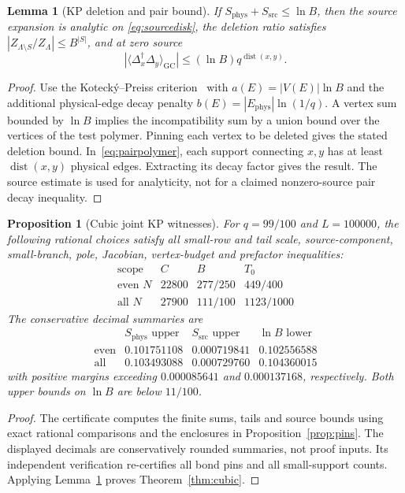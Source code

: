 \documentclass[11pt]{article}
\theoremstyle{plain}
\newtheorem{lemma}{Lemma}
\newtheorem{proposition}{Proposition}
\theoremstyle{remark}
\DeclareMathOperator{\dist}{dist}
\newcommand{\GC}{\mathrm{GC}}
\newcommand{\src}{\mathrm{src}}
\newcommand{\phys}{\mathrm{phys}}
\begin{document}
\begin{lemma}[KP deletion and pair bound]\label{lem:kp}
If $S_\phys+S_\src\le\ln B$, then the source expansion is analytic on
\eqref{eq:sourcedisk}, the deletion ratio satisfies
$|Z_{\Lambda\setminus S}/Z_\Lambda|\le B^{|S|}$, and at zero source
\[
|\langle\Delta_x^\dagger\Delta_y\rangle_\GC|
\le(\ln B)q^{\dist(x,y)}.
\]
\end{lemma}
\begin{proof}
Use the Koteck\'y--Preiss criterion~\cite{kotecky1986} with
$a(E)=|V(E)|\ln B$ and the additional physical-edge decay penalty
$b(E)=|E_\phys|\ln(1/q)$. A vertex sum bounded by $\ln B$ implies the
incompatibility sum by a union bound over the vertices of the test polymer.
Pinning each vertex to be deleted gives the stated deletion bound.
In~\eqref{eq:pairpolymer}, each support connecting $x,y$ has at least
$\dist(x,y)$ physical edges. Extracting its decay factor gives the result.
The source estimate is used for analyticity, not for a claimed nonzero-source
pair decay inequality.
\end{proof}

\begin{proposition}[Cubic joint KP witnesses]\label{prop:cubicbudget}
For $q=99/100$ and $L=100000$, the following rational choices satisfy all
small-row and tail scale, source-component, small-branch, pole, Jacobian,
vertex-budget and prefactor inequalities:
\[
\begin{array}{c|ccc}
\text{scope}&C&B&T_0\\\hline
\text{even }N&22800&277/250&449/400\\
\text{all }N&27900&111/100&1123/1000
\end{array}
\]
The conservative decimal summaries are
\[
\begin{array}{c|ccc}
& S_\phys\text{ upper}&S_\src\text{ upper}&\ln B\text{ lower}\\\hline
\text{even}&0.101751108&0.000719841&0.102556588\\
\text{all}&0.103493088&0.000729760&0.104360015
\end{array}
\]
with positive margins exceeding $0.000085641$ and $0.000137168$,
respectively. Both upper bounds on $\ln B$ are below $11/100$.
\end{proposition}
\begin{proof}
The certificate computes the finite sums, tails and source bounds using
exact rational comparisons and the enclosures in Proposition~\ref{prop:pins}.
The displayed decimals are conservatively rounded summaries, not proof inputs.
Its independent verification re-certifies all bond pins and all small-support
counts. Applying Lemma~\ref{lem:kp} proves Theorem~\ref{thm:cubic}.
\end{proof}
\end{document}
